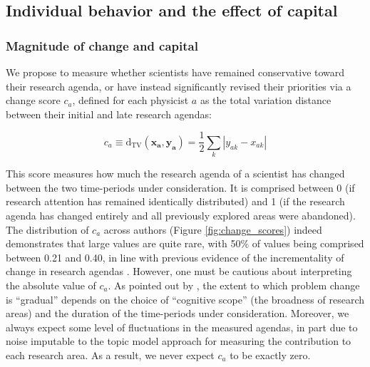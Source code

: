\documentclass{article}
\begin{document}

\subsection{\label{sec:magnitude}Individual behavior and the effect of capital}

\subsubsection{Magnitude of change and capital}

We propose to measure whether scientists have remained conservative toward their research agenda, or have instead significantly revised their priorities via a change score $c_a$, defined for each physicist $a$ as the total variation distance between their initial and late research agendas:

\begin{equation}
    c_a \equiv \mathrm{d}_{\text{TV}}(\bm{x_a},\bm{y_a}) = \frac{1}{2} \sum_k |y_{ak}-x_{ak}|
\end{equation}

This score measures how much the research agenda of a scientist has changed between the two time-periods under consideration. It is comprised between 0 (if research attention has remained identically distributed) and 1 (if the research agenda has changed entirely and all previously explored areas were abandoned). The distribution of $c_a$ across authors (Figure \ref{fig:change_scores}) indeed demonstrates that large values are quite rare, with 50\% of values being comprised between 0.21 and 0.40, in line with previous evidence of the incrementality of change in research agendas \citep{Gieryn1978,Jia2017,Aleta2019}. However, one must be cautious about interpreting the absolute value of $c_a$. As pointed out by \citet{Gieryn1978}, the extent to which problem change is ``gradual'' depends on the choice of ``cognitive scope'' (the broadness of research areas) and the duration of the time-periods under consideration.  Moreover, we always expect some level of fluctuations in the measured agendas, in part due to noise imputable to the topic model approach for measuring the contribution to each research area. As a result, we never expect $c_a$ to be exactly zero.
\end{document}
